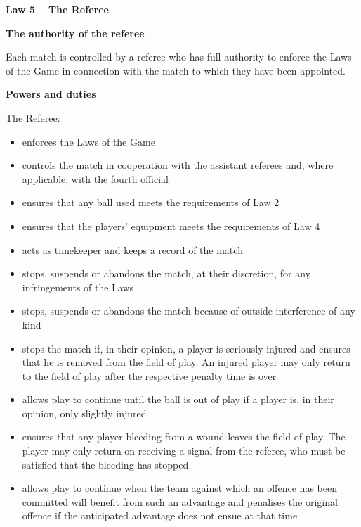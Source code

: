 \clearpage
\sffamily
{\bfseries\color[rgb]{0.4,0.4,0.4}
Law 5 -- The Referee}
{}

\bigskip

{\bfseries The authority of the referee}

\headlinebox

Each match is controlled by a referee who has full authority to enforce the Laws of the Game in connection with the match to which they have been appointed.

\bigskip

{\bfseries Powers and duties}

\headlinebox

The Referee:

\begin{itemize}
\item enforces the Laws of the Game
\item controls the match in cooperation with the assistant referees and, where applicable, with the fourth official
\item ensures that any ball used meets the requirements of Law 2 
\item ensures that the players' equipment meets the requirements of Law 4
\item acts as timekeeper and keeps a record of the match
\item stops, suspends or abandons the match, at their discretion, for any infringements of the Laws
\item stops, suspends or abandons the match because of outside interference of any kind
\item stops the match if, in their opinion, a player is seriously injured and ensures that he is removed from the field of play. An injured player may only return to the field of play after the respective penalty time is over 
\item allows play to continue until the ball is out of play if a player is, in their opinion, only slightly injured 
\item ensures that any player bleeding from a wound leaves the field of play. The player may only return on receiving a signal from the referee, who must be satisfied that the bleeding has stopped
\item allows play to continue when the team against which an offence has been committed will benefit from such an advantage and penalises the original offence if the anticipated advantage does not ensue at that time

\end{itemize}
